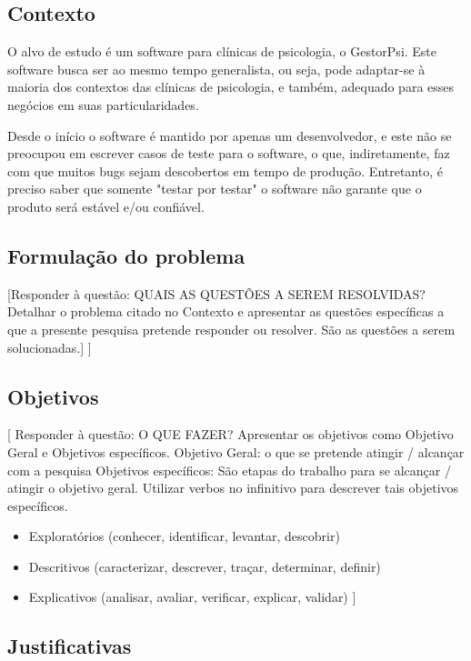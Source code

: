 
\subsection{Contexto} %
\label{sub:contexto}
O alvo de estudo é um software para clínicas de psicologia, o GestorPsi.
Este software busca ser ao mesmo tempo generalista, ou seja,
pode adaptar-se à maioria dos contextos das clínicas de psicologia, e também,
adequado para esses negócios em suas particularidades.

Desde o início o software é mantido por apenas um desenvolvedor,
e este não se preocupou em escrever casos de teste para o software, o que,
indiretamente, faz com que muitos bugs sejam descobertos em tempo de produção.
Entretanto, é preciso saber que somente "testar por testar" o software não garante que o
produto será estável e/ou confiável.
\subsection{Formulação do problema} %
\label{sub:formula_o_do_problema}

[Responder à questão: QUAIS AS QUESTÕES A SEREM RESOLVIDAS?
Detalhar o problema citado no Contexto e apresentar as questões específicas a que a presente pesquisa pretende responder ou resolver. São as questões a serem solucionadas.]
]

\subsection{Objetivos} %
\label{sub:objetivos}

[ Responder à questão: O QUE FAZER?
Apresentar os objetivos como Objetivo Geral e Objetivos específicos.
Objetivo Geral: o que se pretende atingir / alcançar com a pesquisa
Objetivos específicos: São etapas do trabalho para se alcançar / atingir o objetivo geral. Utilizar verbos no infinitivo para descrever tais objetivos específicos.
\begin{itemize}
	\item Exploratórios (conhecer, identificar, levantar, descobrir)
	\item Descritivos (caracterizar, descrever, traçar, determinar, definir)
	\item Explicativos (analisar, avaliar, verificar, explicar, validar)   ]
\end{itemize}


\subsection{Justificativas} %
\label{sub:justificativas}

